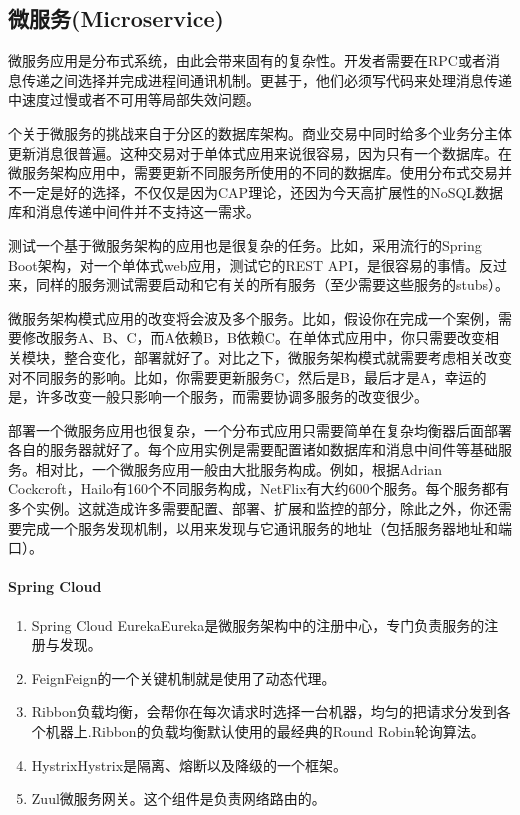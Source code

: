 \documentclass[../../../interview-questions.tex]{subfiles}
\begin{document}
\subsection{微服务(Microservice)}

微服务应用是分布式系统，由此会带来固有的复杂性。开发者需要在RPC或者消息传递之间选择并完成进程间通讯机制。更甚于，他们必须写代码来处理消息传递中速度过慢或者不可用等局部失效问题。

个关于微服务的挑战来自于分区的数据库架构。商业交易中同时给多个业务分主体更新消息很普遍。这种交易对于单体式应用来说很容易，因为只有一个数据库。在微服务架构应用中，需要更新不同服务所使用的不同的数据库。使用分布式交易并不一定是好的选择，不仅仅是因为CAP理论，还因为今天高扩展性的NoSQL数据库和消息传递中间件并不支持这一需求。

测试一个基于微服务架构的应用也是很复杂的任务。比如，采用流行的Spring Boot架构，对一个单体式web应用，测试它的REST API，是很容易的事情。反过来，同样的服务测试需要启动和它有关的所有服务（至少需要这些服务的stubs）。


微服务架构模式应用的改变将会波及多个服务。比如，假设你在完成一个案例，需要修改服务A、B、C，而A依赖B，B依赖C。在单体式应用中，你只需要改变相关模块，整合变化，部署就好了。对比之下，微服务架构模式就需要考虑相关改变对不同服务的影响。比如，你需要更新服务C，然后是B，最后才是A，幸运的是，许多改变一般只影响一个服务，而需要协调多服务的改变很少。

部署一个微服务应用也很复杂，一个分布式应用只需要简单在复杂均衡器后面部署各自的服务器就好了。每个应用实例是需要配置诸如数据库和消息中间件等基础服务。相对比，一个微服务应用一般由大批服务构成。例如，根据Adrian Cockcroft，Hailo有160个不同服务构成，NetFlix有大约600个服务。每个服务都有多个实例。这就造成许多需要配置、部署、扩展和监控的部分，除此之外，你还需要完成一个服务发现机制，以用来发现与它通讯服务的地址（包括服务器地址和端口）。


\paragraph{Spring Cloud}


\begin{enumerate}
\item {Spring Cloud Eureka}Eureka是微服务架构中的注册中心，专门负责服务的注册与发现。
\item{Feign}Feign的一个关键机制就是使用了动态代理。
\item{Ribbon}负载均衡，会帮你在每次请求时选择一台机器，均匀的把请求分发到各个机器上.Ribbon的负载均衡默认使用的最经典的Round Robin轮询算法。
\item{Hystrix}Hystrix是隔离、熔断以及降级的一个框架。
\item{Zuul}微服务网关。这个组件是负责网络路由的。
\end{enumerate}
\end{document}
